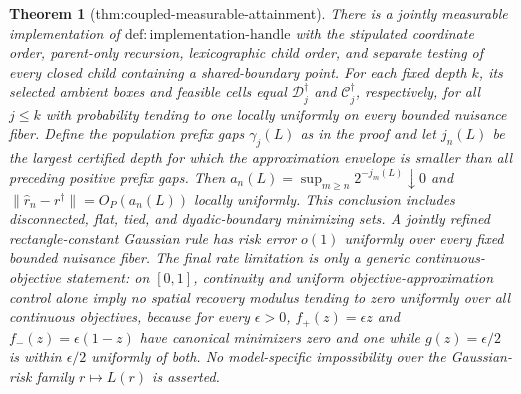 \documentclass{article}
\newtheorem{theorem}{Theorem}
\begin{document}
\begin{theorem}[thm:coupled-measurable-attainment]\label{thm:coupled-measurable-attainment}
There is a jointly measurable implementation of \(\mathrm{def:implementation\text{-}handle}\) with the stipulated coordinate order, parent-only recursion, lexicographic child order, and separate testing of every closed child containing a shared-boundary point. For each fixed depth \(k\), its selected ambient boxes and feasible cells equal \(\mathcal D_j^\dagger\) and \(\mathcal C_j^\dagger\), respectively, for all \(j\le k\) with probability tending to one locally uniformly on every bounded nuisance fiber. Define the population prefix gaps \(\gamma_j(L)\) as in the proof and let \(j_n(L)\) be the largest certified depth for which the approximation envelope is smaller than all preceding positive prefix gaps. Then \(a_n(L)=\sup_{m\ge n}2^{-j_m(L)}\downarrow0\) and \(\lVert\widehat r_n-r^\dagger\rVert=O_P(a_n(L))\) locally uniformly. This conclusion includes disconnected, flat, tied, and dyadic-boundary minimizing sets. A jointly refined rectangle-constant Gaussian rule has risk error \(o(1)\) uniformly over every fixed bounded nuisance fiber. The final rate limitation is only a generic continuous-objective statement: on \([0,1]\), continuity and uniform objective-approximation control alone imply no spatial recovery modulus tending to zero uniformly over all continuous objectives, because for every \(\epsilon>0\), \(f_+(z)=\epsilon z\) and \(f_-(z)=\epsilon(1-z)\) have canonical minimizers zero and one while \(g(z)=\epsilon/2\) is within \(\epsilon/2\) uniformly of both. No model-specific impossibility over the Gaussian-risk family \(r\mapsto L(r)\) is asserted.
\end{theorem}
\end{document}

